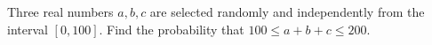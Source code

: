 Three real numbers $a,b,c$ are selected randomly and independently from the interval $[0,100]$. Find the probability that $100\le a+b+c\le200$.
